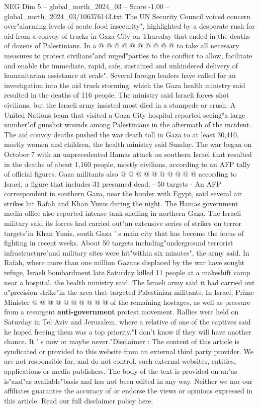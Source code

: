 \begin{textsample}{NEG Dim 5 – global\_north\_2024\_03 – Score -1.00 – global\_north\_2024\_03/106376143.txt}
The UN Security Council voiced concern over"alarming levels of acute food insecurity", highlighted by a desperate rush for aid from a convoy of trucks in Gaza City on Thursday that ended in the deaths of dozens of Palestinians.
In a @ @ @ @ @ @ @ @ @ @ to take all necessary measures to protect civilians"and urged"parties to the conflict to allow, facilitate and enable the immediate, rapid, safe, sustained and unhindered delivery of humanitarian assistance at scale".
Several foreign leaders have called for an investigation into the aid truck storming, which the Gaza health ministry said resulted in the deaths of 116 people.
The ministry said Israeli forces shot civilians, but the Israeli army insisted most died in a stampede or crush.
A United Nations team that visited a Gaza City hospital reported seeing"a large number"of gunshot wounds among Palestinians in the aftermath of the incident.
The aid convoy deaths pushed the war death toll in Gaza to at least 30,410, mostly women and children, the health ministry said Sunday.
The war began on October 7 with an unprecedented Hamas attack on southern Israel that resulted in the deaths of about 1,160 people, mostly civilians, according to an AFP tally of official figures.
Gaza militants also @ @ @ @ @ @ @ @ @ @ according to Israel, a figure that includes 31 presumed dead. - 50 targets - An AFP correspondent in southern Gaza, near the border with Egypt, said several air strikes hit Rafah and Khan Yunis during the night.
The Hamas government media office also reported intense tank shelling in northern Gaza.
The Israeli military said its forces had carried out"an extensive series of strikes on terror targets"in Khan Yunis, south Gaza ' s main city that has become the focus of fighting in recent weeks.
About 50 targets including"underground terrorist infrastructure"and military sites were hit"within six minutes", the army said.
In Rafah, where more than one million Gazans displaced by the war have sought refuge, Israeli bombardment late Saturday killed 11 people at a makeshift camp near a hospital, the health ministry said.
The Israeli army said it had carried out a"precision strike"in the area that targeted Palestinian militants.
In Israel, Prime Minister @ @ @ @ @ @ @ @ @ @ of the remaining hostages, as well as pressure from a resurgent \textbf{anti-government} protest movement.
Rallies were held on Saturday in Tel Aviv and Jerusalem, where a relative of one of the captives said he hoped freeing them was a top priority."I don't know if they will have another chance.
It ' s now or maybe never."Disclaimer : The content of this article is syndicated or provided to this website from an external third party provider.
We are not responsible for, and do not control, such external websites, entities, applications or media publishers.
The body of the text is provided on an"as is"and"as available"basis and has not been edited in any way.
Neither we nor our affiliates guarantee the accuracy of or endorse the views or opinions expressed in this article.
Read our full disclaimer policy here.

\end{textsample}
